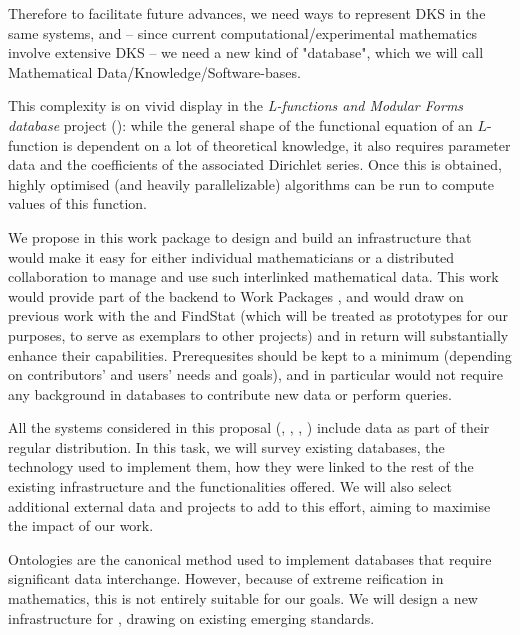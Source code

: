 \begin{workpackage}[id=dksbases,wphases=1-48!.5,
  title=Data/Knowledge/Software-Bases,
  ZHRM=1,JURM=36]
\begin{wpdescription}
Therefore to facilitate future advances, we need ways to represent DKS in the same systems, and -- since current computational/experimental mathematics involve extensive DKS -- we need a new kind of "database", which we will call Mathematical Data/Knowledge/Software-bases.

This complexity is on vivid display in the \emph{L-functions and Modular Forms database} project (\LMFDB): while the general shape of the functional equation of an $L$-function is dependent on a lot of theoretical knowledge, it also requires parameter data and the coefficients of the associated Dirichlet series. Once this is obtained, highly optimised (and heavily parallelizable) algorithms can be run to compute values of this function. 

We propose in this work package to design and build an infrastructure that would make it easy for either individual mathematicians or a distributed collaboration to manage and use such interlinked mathematical data. This work would provide part of the backend to Work Packages , and would draw on previous work with the \LMFDB and FindStat (which will be treated as prototypes for our purposes, to serve as exemplars to other projects) and in return will substantially enhance their capabilities. Prerequesites should be kept to a minimum (depending on contributors' and users' needs and goals), and in particular would not require any background in databases to contribute new data or perform queries. 
\end{wpdescription}
\begin{tasklist}
\begin{task}[title=Survey of existing databases,id=data_assessment]
All the systems considered in this proposal (\GAP, \Sage, \Pari, \Singular) include data as part of their regular distribution. In this task, we will survey existing databases, the technology used to implement them, how they were linked to the rest of the existing infrastructure and the functionalities offered. We will also select additional external data and projects to add to this effort, aiming to maximise the impact of our work. 
\end{task}

\begin{task}[title={Design of new infrastructure, formulation of requirements}, id=data_design]
Ontologies are the canonical method used to implement databases that require significant data interchange. However, because of extreme reification in mathematics, this is not entirely suitable for our goals. We will design a new infrastructure for \TheProject, drawing on existing emerging standards. 


\end{task}
\end{tasklist}
\end{workpackage}
